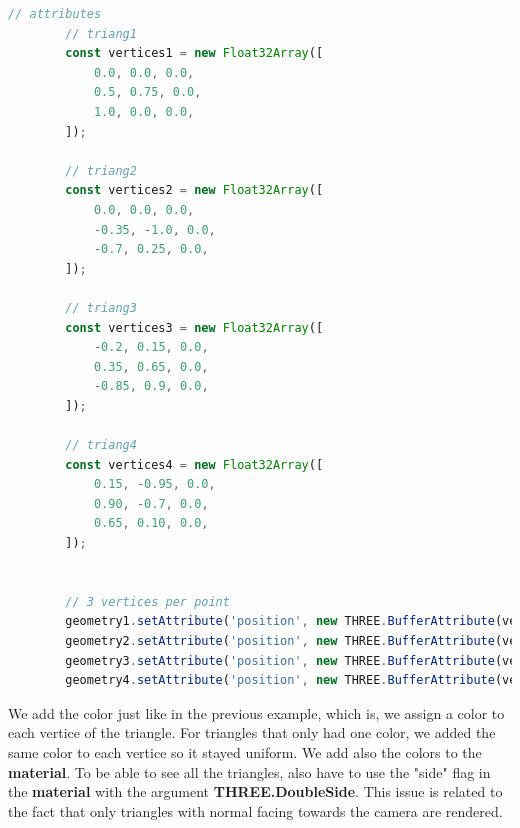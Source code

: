 \documentclass{article}
\begin{document}
\begin{lstlisting}[language=JavaScript, caption=Position.]
          // attributes
		// triang1
        const vertices1 = new Float32Array([
            0.0, 0.0, 0.0,
            0.5, 0.75, 0.0,
            1.0, 0.0, 0.0,
        ]);

		// triang2
        const vertices2 = new Float32Array([
            0.0, 0.0, 0.0,
            -0.35, -1.0, 0.0,
            -0.7, 0.25, 0.0,
        ]);

		// triang3
        const vertices3 = new Float32Array([
            -0.2, 0.15, 0.0,
            0.35, 0.65, 0.0,
            -0.85, 0.9, 0.0,
        ]);

		// triang4
        const vertices4 = new Float32Array([
            0.15, -0.95, 0.0,
            0.90, -0.7, 0.0,
            0.65, 0.10, 0.0,
        ]);


        // 3 vertices per point
        geometry1.setAttribute('position', new THREE.BufferAttribute(vertices1, 3));
        geometry2.setAttribute('position', new THREE.BufferAttribute(vertices2, 3));
        geometry3.setAttribute('position', new THREE.BufferAttribute(vertices3, 3));
        geometry4.setAttribute('position', new THREE.BufferAttribute(vertices4, 3));
\end{lstlisting}

We add the color just like in the previous example, which is, we assign a color to each vertice of the triangle. For triangles that only had one color, we added the same color to each vertice so it stayed uniform. We add also the colors to the \textbf{material}.  To be able to see all the triangles, also have to use the "side" flag in the \textbf{material} with the argument \textbf{THREE.DoubleSide}. This issue is related to the fact that only triangles with normal facing towards the camera are rendered.
\end{document}
